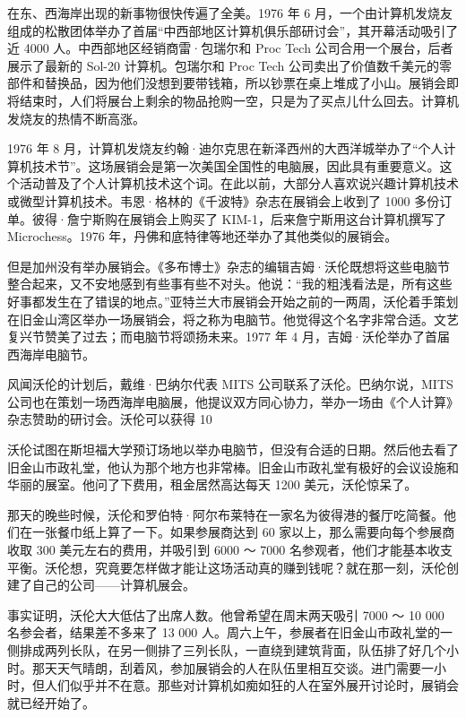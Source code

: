 \documentclass[12pt,UTF8]{ctexbook}
\begin{document}
在东、西海岸出现的新事物很快传遍了全美。1976 年 6 月，一个由计算机发烧友组成的松散团体举办了首届“中西部地区计算机俱乐部研讨会”，其开幕活动吸引了近 4000 人。中西部地区经销商雷·包瑞尔和 Proc Tech 公司合用一个展台，后者展示了最新的 Sol-20 计算机。包瑞尔和 Proc Tech 公司卖出了价值数千美元的零部件和替换品，因为他们没想到要带钱箱，所以钞票在桌上堆成了小山。展销会即将结束时，人们将展台上剩余的物品抢购一空，只是为了买点儿什么回去。计算机发烧友的热情不断高涨。

1976 年 8 月，计算机发烧友约翰·迪尔克思在新泽西州的大西洋城举办了“个人计算机技术节”。这场展销会是第一次美国全国性的电脑展，因此具有重要意义。这个活动普及了个人计算机技术这个词。在此以前，大部分人喜欢说兴趣计算机技术或微型计算机技术。韦恩·格林的《千波特》杂志在展销会上收到了 1000 多份订单。彼得·詹宁斯购在展销会上购买了 KIM-1，后来詹宁斯用这台计算机撰写了 Microchess。1976 年，丹佛和底特律等地还举办了其他类似的展销会。

但是加州没有举办展销会。《多布博士》杂志的编辑吉姆·沃伦既想将这些电脑节整合起来，又不安地感到有些事有些不对头。他说：“我的粗浅看法是，所有这些好事都发生在了错误的地点。”亚特兰大市展销会开始之前的一两周，沃伦着手策划在旧金山湾区举办一场展销会，将之称为电脑节。他觉得这个名字非常合适。文艺复兴节赞美了过去；而电脑节将颂扬未来。1977 年 4 月，吉姆·沃伦举办了首届西海岸电脑节。

风闻沃伦的计划后，戴维·巴纳尔代表 MITS 公司联系了沃伦。巴纳尔说，MITS 公司也在策划一场西海岸电脑展，他提议双方同心协力，举办一场由《个人计算》杂志赞助的研讨会。沃伦可以获得 10%

沃伦试图在斯坦福大学预订场地以举办电脑节，但没有合适的日期。然后他去看了旧金山市政礼堂，他认为那个地方也非常棒。旧金山市政礼堂有极好的会议设施和华丽的展室。他问了下费用，租金居然高达每天 1200 美元，沃伦惊呆了。

那天的晚些时候，沃伦和罗伯特·阿尔布莱特在一家名为彼得港的餐厅吃简餐。他们在一张餐巾纸上算了一下。如果参展商达到 60 家以上，那么需要向每个参展商收取 300 美元左右的费用，并吸引到 6000 ～ 7000 名参观者，他们才能基本收支平衡。沃伦想，究竟要怎样做才能让这场活动真的赚到钱呢？就在那一刻，沃伦创建了自己的公司——计算机展会。

事实证明，沃伦大大低估了出席人数。他曾希望在周末两天吸引 7000 ～ 10 000 名参会者，结果差不多来了 13 000 人。周六上午，参展者在旧金山市政礼堂的一侧排成两列长队，在另一侧排了三列长队，一直绕到建筑背面，队伍排了好几个小时。那天天气晴朗，刮着风，参加展销会的人在队伍里相互交谈。进门需要一小时，但人们似乎并不在意。那些对计算机如痴如狂的人在室外展开讨论时，展销会就已经开始了。
\end{document}
